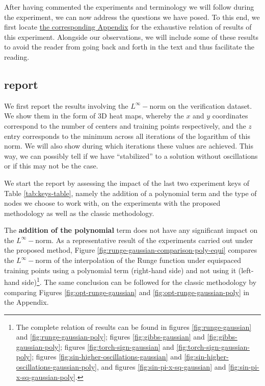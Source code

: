 \documentclass[12pt]{report} %
\begin{document}
After having commented the experiments and terminology we will follow during the experiment, we can now address the questions we have posed. To this end, we first locate \hyperref[appendix-1d]{the corresponding Appendix} for the exhaustive relation of results of this experiment. Alongside our observations, we will include some of these results to avoid the reader from going back and forth in the text and thus facilitate the reading. 

\subsection*{report}

We first report the results involving the $L^\infty-$norm on the verification dataset. We show them in the form of 3D heat maps, whereby the $x$ and $y$ coordinates correspond to the number of centers and training points respectively, and the $z$ entry corresponds to the minimum across all iterations of the logarithm of this norm. %
We will also show during which iterations these values are achieved. This way, we can possibly tell if we have ``stabilized'' to a solution without oscillations or if this may not be the case.

We start the report by assessing the impact of the last two experiment keys
of Table \ref{tab:keys-table}, namely the addition of a polynomial term and
the type of nodes we choose to work with, on the experiments with the proposed methodology as well as the classic methodology. 

The \textbf{addition of the polynomial} term
does not have any significant impact on the $L^{\infty} -$norm. As a representative result of the experiments carried out under the proposed method, Figure \ref{fig:runge-gaussian-comparison-poly-equi} compares the $L^{\infty} -$norm of the interpolation of the Runge function under equispaced training points using a polynomial term (right-hand side) and not using it (left-hand side)\footnote{The complete relation of results can be found in figures \ref{fig:runge-gaussian} and \ref{fig:runge-gaussian-poly}; figures
\ref{fig:gibbs-gaussian} and \ref{fig:gibbs-gaussian-poly}; figures
\ref{fig:torch-sign-gaussian} and \ref{fig:torch-sign-gaussian-poly}; figures
\ref{fig:sin-higher-oscillations-gaussian} and
\ref{fig:sin-higher-oscillations-gaussian-poly}, and figures
\ref{fig:sin-pi-x-sq-gaussian} and \ref{fig:sin-pi-x-sq-gaussian-poly}.}. The same conclusion can be followed for the classic methodology by comparing Figures \ref{fig:opt-runge-gaussian} and \ref{fig:opt-runge-gaussian-poly} in the Appendix.
\end{document}
